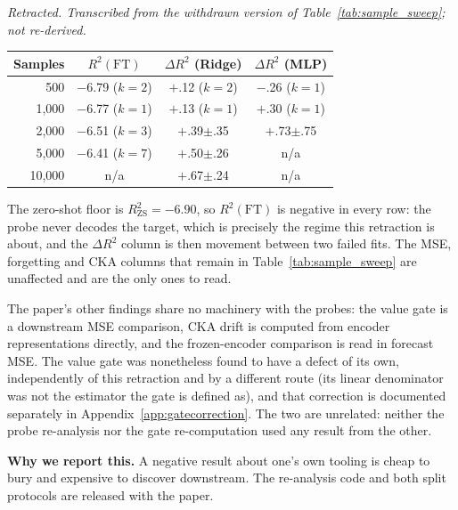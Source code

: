 \begin{center}
\small
\emph{Retracted.  Transcribed from the withdrawn version of
Table~\ref{tab:sample_sweep}; not re-derived.}\\[3pt]
\begin{tabular}{@{}rccc@{}}
\toprule
Samples & $R^2(\text{FT})$ & $\Delta R^2$ (Ridge) & $\Delta R^2$ (MLP) \\
\midrule
500      & $-$6.79 ($k{=}2$) & $+$.12 ($k{=}2$)      & $-$.26 ($k{=}1$) \\
1{,}000  & $-$6.77 ($k{=}1$) & $+$.13 ($k{=}1$)      & $+$.30 ($k{=}1$) \\
2{,}000  & $-$6.51 ($k{=}3$) & $+$.39{\tiny$\pm$.35} & $+$.73{\tiny$\pm$.75} \\
5{,}000  & $-$6.41 ($k{=}7$) & $+$.50{\tiny$\pm$.26} & n/a \\
10{,}000 & n/a               & $+$.67{\tiny$\pm$.24} & n/a \\
\bottomrule
\end{tabular}
\end{center}

\noindent The zero-shot floor is $R^2_\text{ZS}{=}{-}6.90$, so $R^2(\text{FT})$
is negative in every row: the probe never decodes the target, which is precisely
the regime this retraction is about, and the $\Delta R^2$ column is then
movement between two failed fits.  The MSE, forgetting and CKA columns that
remain in Table~\ref{tab:sample_sweep} are unaffected and are the only ones to
read.

The paper's other findings share no machinery with the probes: the value gate
is a downstream MSE comparison, CKA drift is computed from encoder
representations directly, and the frozen-encoder comparison is read in
forecast MSE.  The value gate was nonetheless found to have a defect of its
own, independently of this retraction and by a different route (its linear
denominator was not the estimator the gate is defined as), and that correction
is documented separately in Appendix~\ref{app:gatecorrection}.  The two are
unrelated: neither the probe re-analysis nor the gate re-computation used any
result from the other.

\textbf{Why we report this.} A negative result about one's own tooling is
cheap to bury and expensive to discover downstream. The re-analysis code and
both split protocols are released with the paper.

